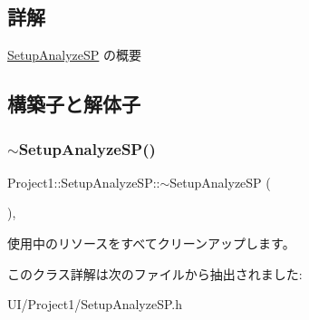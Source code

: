 \subsection{詳解}
\hyperlink{class_project1_1_1_setup_analyze_s_p}{Setup\+Analyze\+SP} の概要 



\subsection{構築子と解体子}
\mbox{\label{class_project1_1_1_setup_analyze_s_p_abb81aeae2341ceec276805a830e94b67}} 
\subsubsection{\texorpdfstring{$\sim$\+Setup\+Analyze\+S\+P()}{~SetupAnalyzeSP()}}
{\footnotesize\ttfamily Project1\+::\+Setup\+Analyze\+S\+P\+::$\sim$\+Setup\+Analyze\+SP (\begin{DoxyParamCaption}{ }\end{DoxyParamCaption})\hspace{0.3cm}{\ttfamily [inline]}, {\ttfamily [protected]}}



使用中のリソースをすべてクリーンアップします。 



このクラス詳解は次のファイルから抽出されました\+:\begin{DoxyCompactItemize}
\item 
U\+I/\+Project1/Setup\+Analyze\+S\+P.\+h\end{DoxyCompactItemize}
